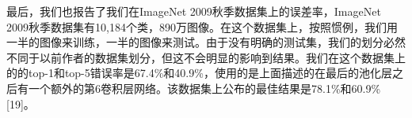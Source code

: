 最后，我们也报告了我们在ImageNet 2009秋季数据集上的误差率，ImageNet 2009秋季数据集有10,184个类，890万图像。在这个数据集上，按照惯例，我们用一半的图像来训练，一半的图像来测试。由于没有明确的测试集，我们的划分必然不同于以前作者的数据集划分，但这不会明显的影响到结果。我们在这个数据集上的的top-1和top-5错误率是67.4\%和40.9\%，使用的是上面描述的在最后的池化层之后有一个额外的第6卷积层网络。该数据集上公布的最佳结果是78.1\%和60.9\%[19]。\\


